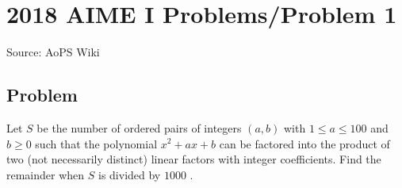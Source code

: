 \documentclass[12pt]{article}
\begin{document}
\section*{{2018 AIME I Problems/Problem 1}}
Source: AoPS Wiki

\subsection*{Problem}
Let $S$ be the number of ordered pairs of integers $(a,b)$ with $1 \leq a \leq 100$ and $b \geq 0$ such that the polynomial $x^2+ax+b$ can be factored into the product of two (not necessarily distinct) linear factors with integer coefficients. Find the remainder when $S$ is divided by $1000$ .
\end{document}
